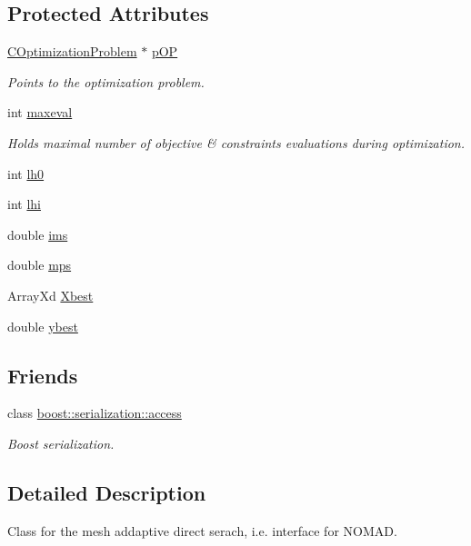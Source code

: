 \subsection*{Protected Attributes}
\begin{DoxyCompactItemize}
\item 
\hyperlink{class_c_optimization_problem}{C\-Optimization\-Problem} $\ast$ \hyperlink{class_c_m_a_d_s_a2df4d9f465992f6130c89fed7880e4e7}{p\-O\-P}
\begin{DoxyCompactList}\small\item\em Points to the optimization problem. \end{DoxyCompactList}\item 
int \hyperlink{class_c_m_a_d_s_ade4448bc470dc7c4c64f890c87f762da}{maxeval}
\begin{DoxyCompactList}\small\item\em Holds maximal number of objective \& constraints evaluations during optimization. \end{DoxyCompactList}\item 
int \hyperlink{class_c_m_a_d_s_a4eaead3a0de0217d182cd70b858c066f}{lh0}
\item 
int \hyperlink{class_c_m_a_d_s_ac6c70518f5b7d42b32f656419406ed7a}{lhi}
\item 
double \hyperlink{class_c_m_a_d_s_a6274e43889cea689ac1bc2d3f2895528}{ims}
\item 
double \hyperlink{class_c_m_a_d_s_a96712dada3b9eb67c28026ac994b5eb1}{mps}
\item 
Array\-Xd \hyperlink{class_c_m_a_d_s_a632620e4e6de702a936648fe4bc8dbe1}{Xbest}
\item 
double \hyperlink{class_c_m_a_d_s_a81f3cabb204f7b152714f65a56f7dac4}{ybest}
\end{DoxyCompactItemize}
\subsection*{Friends}
\begin{DoxyCompactItemize}
\item 
class \hyperlink{class_c_m_a_d_s_ac98d07dd8f7b70e16ccb9a01abf56b9c}{boost\-::serialization\-::access}
\begin{DoxyCompactList}\small\item\em Boost serialization. \end{DoxyCompactList}\end{DoxyCompactItemize}


\subsection{Detailed Description}
Class for the mesh addaptive direct serach, i.\-e. interface for N\-O\-M\-A\-D. 


